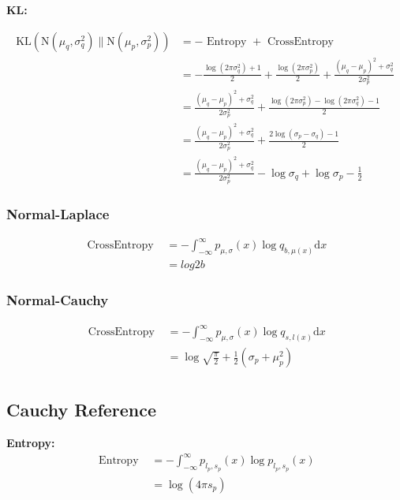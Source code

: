 \documentclass{article}
\begin{document}
\noindent \textbf{KL:}

$$ \begin{aligned} \mathrm{KL}\left(\mathrm{N}\left(\mu_{q}, \sigma_{q}^{2}\right) \| \mathrm{N}\left(\mu_{p}, \sigma_{p}^{2}\right)\right)&=-\text { Entropy }+\text { CrossEntropy } \\ &=-\frac{\log \left(2 \pi \sigma_{q}^{2}\right)+1}{2}+ \frac{\log \left(2 \pi \sigma_{p}^{2}\right)}{2}+\frac{\left(\mu_{q}-\mu_{p}\right)^{2}+\sigma_{q}^{2}}{2 \sigma^2_{p}} \\ &=\frac{\left(\mu_{q}-\mu_{p}\right)^{2}+\sigma_{q}^{2}}{2 \sigma^2_{p}} +\frac{\log \left(2 \pi \sigma_{p}^{2}\right)- \log \left(2 \pi \sigma_{q}^{2}\right)-1}{2} \\ &=\frac{\left(\mu_{q}-\mu_{p}\right)^{2}+\sigma_{q}^{2}}{2 \sigma^2_{p}} +\frac{2\log \left(\sigma_{p}-\sigma_{q}\right)-1}{2} \\ &=\frac{\left(\mu_{q}-\mu_{p}\right)^{2}+\sigma_{q}^{2}}{2 \sigma^2_{p}}-\log \sigma_{q}+\log \sigma_{p}-\frac{1}{2} \end{aligned} $$

\subsubsection{Normal-Laplace}

$$ \begin{aligned} \text { CrossEntropy }&=
-\int_{-\infty}^{\infty} p_{ \mu,\sigma}(x) \log q_{b,\mu(x)} \mathrm{d} x \\
&=log2b
\end{aligned}
$$

\subsubsection{Normal-Cauchy}
$$ \begin{aligned}  \text { CrossEntropy }&=-\int_{-\infty}^{\infty} p_{\mu,\sigma}(x) \log q_{s,l(x)} \mathrm{d} x \\
&=\log \sqrt{\frac{\pi}{2}}+ \frac{1}{2} (\sigma_{p}+\mu_{p}^2) \\
\end{aligned}
$$

\subsection{Cauchy Reference}

\noindent \textbf{Entropy:}
$$ \begin{aligned} \text { Entropy } &=-\int_{-\infty}^{\infty} p_{l_{p}, s_{p}}(x) \log p_{l_{p}, s_{p}}(x)\\
&=\log (4 \pi s_{p})\end{aligned} $$
\end{document}
